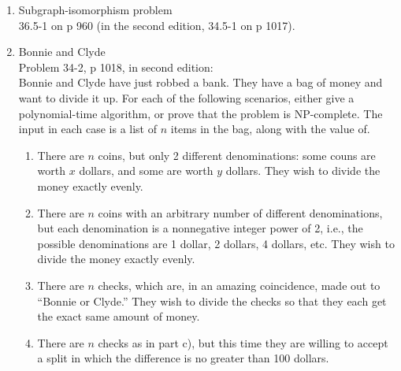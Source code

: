 \documentclass[11pt]{article}
\begin{document}
\begin{enumerate}
    \item Subgraph-isomorphism problem\\
	36.5-1 on p 960
	(in the second edition, 34.5-1 on p 1017).
    \item Bonnie and Clyde\\
	Problem 34-2, p 1018, in second edition:\\
	Bonnie and Clyde have just robbed a bank.  They have a bag of
	money and want to divide it up.  For each of the following 
	scenarios, either give a polynomial-time algorithm, or prove
	that the problem is NP-complete.  The input in each case is
	a list of $n$ items in the bag, along with the value of.
	\begin{enumerate}
	    \item There are $n$ coins, but only 2 different denominations: 
	        some couns are worth $x$ dollars, and some are worth $y$
		dollars.  They wish to divide the money exactly evenly.
	    \item There are $n$ coins with an arbitrary number of 
	    	different denominations, but each denomination is a 
		nonnegative integer power of 2, i.e., the possible 
		denominations are 1 dollar, 2 dollars, 4 dollars, etc.
		They wish to divide the money exactly evenly.
	    \item There are $n$ checks, which are, in an amazing 
	    	coincidence, made out to ``Bonnie or Clyde.''
		They wish to divide the checks so that they each
		get the exact same amount of money.
	    \item There are $n$ checks as in part c), but this time they
	    	are willing to accept a split  in which the difference
		is no greater than 100 dollars.
		\end{enumerate}
	
	
\end{enumerate}
\end{document}

